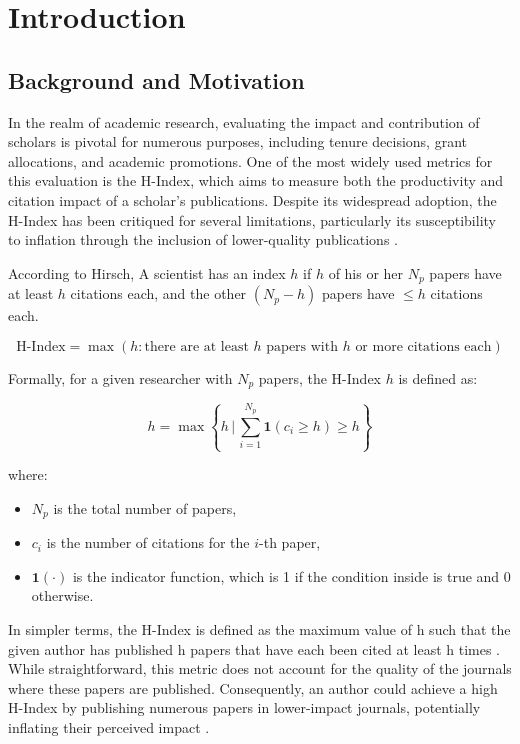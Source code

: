 \chapter{Introduction}
\label{ch:intro}

\section{Background and Motivation}
In the realm of academic research, evaluating the impact and contribution of
scholars is pivotal for numerous purposes, including tenure decisions, grant
allocations, and academic promotions. One of the most widely used metrics for
this evaluation is the H-Index, which aims to measure both the productivity and
citation impact of a scholar’s publications. Despite its widespread adoption,
the H-Index has been critiqued for several limitations, particularly its
susceptibility to inflation through the inclusion of lower-quality publications
\cite{costas2007h, tonta2020monetary}.

According to Hirsch, A scientist has an index \( h \) if \( h \) of his or her
\( N_p \) papers have at least \( h \) citations each, and the other \( (N_p -
h) \) papers have \(\leq h \) citations each.

\[
    \text{H-Index} = \max \left( h : \text{there are at least } h \text{ papers with } h \text{ or more citations each} \right)
\]

Formally, for a given researcher with \( N_p \) papers, the H-Index \( h \) is
defined as:

\[
    h = \max \left\{ h \, \Bigg| \, \sum_{i=1}^{N_p} \mathbf{1} (c_i \geq h) \geq h \right\}
\]

where:
\begin{itemize}
    \item \( N_p \) is the total number of papers,
    \item \( c_i \) is the number of citations for the \( i \)-th paper,
    \item \( \mathbf{1}(\cdot) \) is the indicator function, which is 1 if the condition inside is true and 0 otherwise.
\end{itemize} In simpler terms, the H-Index is defined as the maximum value of h
such that the given author has published h papers that have each been cited at least h times \cite{hirsch2005index}.
While straightforward, this metric does not account for the quality of the journals where
these papers are published. Consequently, an author could achieve a high H-Index
by publishing numerous papers in lower-impact journals, potentially inflating their perceived impact \cite{tonta2020monetary}.

